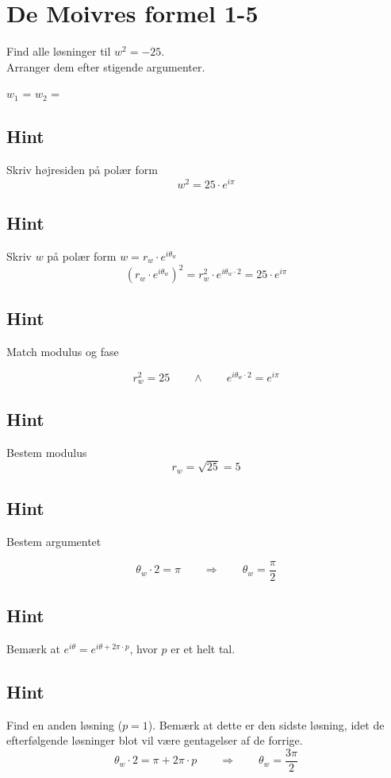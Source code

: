 \documentclass{article}
\newenvironment{exercise}[1]{\newpage\section{#1}}{}
\newcommand{\answerbox}[1]{\fbox{$#1$}}
\newcommand{\hint}{\subsection*{Hint}}
\begin{document}
\begin{exercise}{De Moivres formel 1-5}
	
	Find alle løsninger til $w^2=-25$. \\
	Arranger dem efter stigende argumenter.
	
	$w_1$ = \answerbox{5 \cdot e^{i \frac{\pi}{2}}}		$w_2$ = \answerbox{5 \cdot e^{i \frac{3 \pi}{2}}}		
	
	
	\hint 
	
	Skriv højresiden på polær form
	\[
	w^2 = 25 \cdot e^{i \pi}
	\]
	
	
	\hint
	
	Skriv $w$ på polær form $w = r_w \cdot e^{i \theta_w}$
	\[
	\left(r_w \cdot e^{i \theta_w}\right)^2 = r_w^2 \cdot e^{i \theta_w \cdot 2} = 25 \cdot e^{i \pi}
	\]
	
	\hint 
	Match modulus og fase
	
	\[
	r_w^2 = 25 \qquad \wedge \qquad e^{i \theta_w \cdot 2} = e^{i \pi}
	\]
	
	\hint
	
	Bestem modulus
	\[
	r_w  =  \sqrt{25} = 5
	\]
	
	\hint
	
	Bestem argumentet
	
	\[
	\theta_w \cdot 2 = \pi \qquad \Rightarrow \qquad  \theta_w = \frac{\pi}{2}
	\]
	
	\hint
	
	Bemærk at $e^{i \theta} = e^{i \theta + 2 \pi \cdot p}$, hvor $p$ er et helt tal.
	
	\hint
	
	Find en anden løsning ($p=1$). Bemærk at dette er den sidste løsning, idet de efterfølgende løsninger blot vil være gentagelser af de forrige.
	\[
	\theta_w \cdot 2 = \pi  + 2 \pi \cdot p \qquad \Rightarrow \qquad  \theta_w = \frac{3 \pi}{2}
	\]
	

	
\end{exercise}

\newpage
\end{document}
